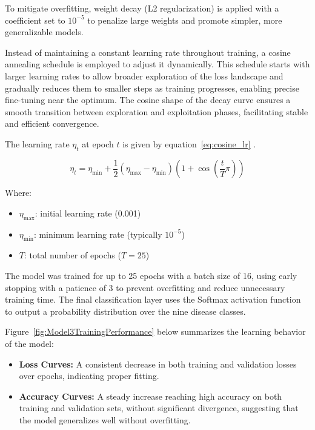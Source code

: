 To mitigate overfitting, weight decay (L2 regularization) is applied with a coefficient set to $10^{-5}$ to penalize large weights and promote simpler, more generalizable models.

Instead of maintaining a constant learning rate throughout training, a cosine annealing schedule is employed to adjust it dynamically. This schedule starts with larger learning rates to allow broader exploration of the loss landscape and gradually reduces them to smaller steps as training progresses, enabling precise fine-tuning near the optimum. The cosine shape of the decay curve ensures a smooth transition between exploration and exploitation phases, facilitating stable and efficient convergence.

The learning rate $\eta_t$ at epoch $t$ is given by equation~\ref{eq:cosine_lr} \parencite{loshchilov2016sgdr}.

\begin{equation}
\eta_t = \eta_{\min} + \frac{1}{2}(\eta_{\max} - \eta_{\min}) \left(1 + \cos\left(\frac{t}{T} \pi\right)\right)
\label{eq:cosine_lr}
\end{equation}



Where:  
\begin{itemize}
  \item $\eta_{\max}$: initial learning rate (0.001)
  \item $\eta_{\min}$: minimum learning rate (typically $10^{-5}$)
  \item $T$: total number of epochs ($T = 25$)
\end{itemize}

The model was trained for up to 25 epochs with a batch size of 16, using early stopping with a patience of 3 to prevent overfitting and reduce unnecessary training time. The final classification layer uses the Softmax activation function to output a probability distribution over the nine disease classes.

Figure~\ref{fig:Model3TrainingPerformance} below summarizes the learning behavior of the model:
\begin{itemize}
    \item \textbf{Loss Curves:} A consistent decrease in both training and validation losses over epochs, indicating proper fitting.
    \item \textbf{Accuracy Curves:} A steady increase reaching high accuracy on both training and validation sets, without significant divergence, suggesting that the model generalizes well without overfitting.
\end{itemize}

